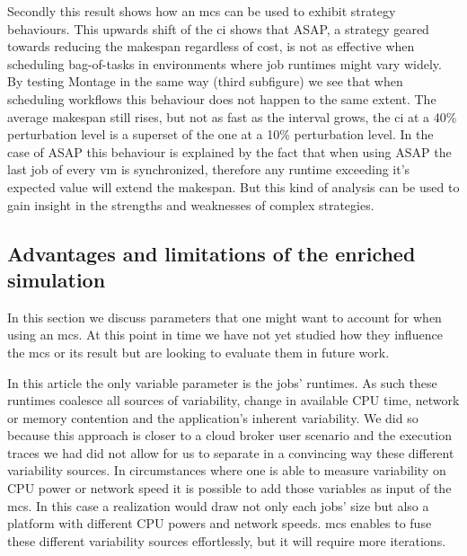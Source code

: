 \documentclass[10pt,conference,compsocconf]{IEEEtran}
\begin{document}
Secondly this result shows how an \ac{mcs} can be used to exhibit strategy
behaviours. This upwards shift of the \ac{ci} shows that ASAP, a strategy
geared towards reducing the makespan regardless of cost, is not as effective
when scheduling bag-of-tasks in environments where job runtimes might vary
widely. By testing Montage in the same way (third subfigure) we see that when
scheduling workflows this behaviour does not happen to the same extent. The
average makespan still rises, but not as fast as the interval grows, the \ac{ci}
at a 40\% perturbation level is a superset of the one at a 10\% perturbation
level. In the case of ASAP this behaviour is explained by the
fact that when using ASAP the last job of every \ac{vm} is synchronized,
therefore any runtime exceeding it's expected value will extend the makespan.
But this kind of analysis can be used to gain insight in the strengths and
weaknesses of complex strategies.


\subsection{Advantages and limitations of the enriched simulation}\label{sec:lim}

In this section we discuss parameters that one might want to account for when
using an \ac{mcs}. At this point in time we have not yet studied how they
influence the \ac{mcs} or its result but are looking to evaluate them in
future work.

In this article the only variable parameter is the jobs' runtimes. As such these
runtimes coalesce all sources of variability, change in available CPU time,
network or memory contention and the application's inherent variability. We did so
because this approach is closer to a cloud broker user scenario and  the
execution traces we had did not allow for us to separate in a convincing way these
different variability sources. In circumstances where one is able to measure variability
on CPU power or network speed it is possible to add those variables as input of
the \ac{mcs}. In this case a realization would draw not only each jobs' size 
 but also a platform with different CPU powers and network speeds.
\ac{mcs} enables to fuse these different variability sources effortlessly, but it will
require more iterations. 
\end{document}

